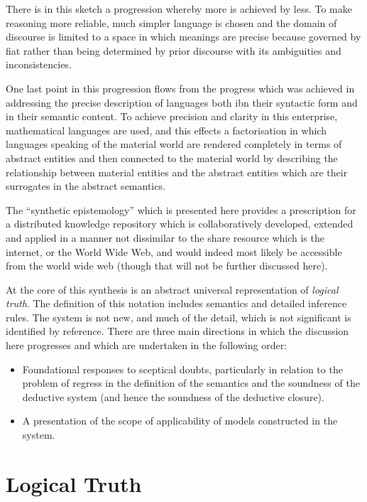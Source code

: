 \documentclass[10pt,titlepage]{book}
\begin{document}
There is in this sketch a progression whereby more is achieved by less.
To make reasoning more reliable, much simpler language is chosen and the domain of discourse is limited to a space in which meanings are precise because governed by fiat rather than being determined by prior discourse with its ambiguities and inconsistencies.

One last point in this progression flows from the progress which was achieved in addressing the precise description of languages both ibn their syntactic form and in their semantic content.
To achieve precision and clarity in this enterprise, mathematical languages are used, and this effects a factorisation in which languages speaking of the material world are rendered completely in terms of abstract entities and then connected to the material world by describing the relationship between material entities and the abstract entities which are their surrogates in the abstract semantics. 

The ``synthetic epistemology'' which is presented here provides a prescription for a distributed knowledge repository which is collaboratively developed, extended and applied in a manner not dissimilar to the share resource which is the internet, or the World Wide Web, and would indeed most likely be accessible from the world wide web (though that will not be further discussed here).

At the core of this synthesis is an abstract universal representation of \emph{logical truth}.
The definition of this notation includes semantics and detailed inference rules.
The system is not new, and much of the detail, which is not significant is identified by reference.
There are three main directions in which the discussion here progresses and which are undertaken in the following order:

\begin{itemize}
\item Foundational responses to sceptical doubts, particularly in relation to the problem of regress in the definition of the semantics and the soundness of the deductive system (and hence the soundness of the deductive closure).
  
\item A presentation of the scope of applicability of models constructed in the system.

\end{itemize}

\section{Logical Truth}
\end{document}
